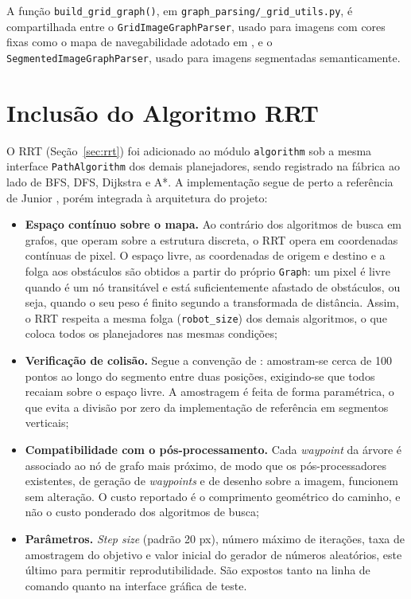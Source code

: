 \documentclass[
    12pt,
    openright,
    oneside,
    a4paper,
    english,
    brazil
]{abntex2}
\begin{document}
A função \texttt{build\_grid\_graph()}, em \texttt{graph\_parsing/\_grid\_utils.py}, é compartilhada entre o \texttt{GridImageGraphParser}, usado para imagens com cores fixas como o mapa de navegabilidade adotado em \cite{junior2025_rrt}, e o \texttt{SegmentedImageGraphParser}, usado para imagens segmentadas semanticamente.

\section{Inclusão do Algoritmo RRT}
\label{sec:impl_rrt}

O RRT (Seção~\ref{sec:rrt}) foi adicionado ao módulo \texttt{algorithm} sob a mesma interface \texttt{PathAlgorithm} dos demais planejadores, sendo registrado na fábrica ao lado de BFS, DFS, Dijkstra e A*. A implementação segue de perto a referência de Junior \cite{junior2025_rrt}, porém integrada à arquitetura do projeto:

\begin{itemize}
    \item \textbf{Espaço contínuo sobre o mapa.} Ao contrário dos algoritmos de busca em grafos, que operam sobre a estrutura discreta, o RRT opera em coordenadas contínuas de pixel. O espaço livre, as coordenadas de origem e destino e a folga aos obstáculos são obtidos a partir do próprio \texttt{Graph}: um pixel é livre quando é um nó transitável e está suficientemente afastado de obstáculos, ou seja, quando o seu peso é finito segundo a transformada de distância. Assim, o RRT respeita a mesma folga (\texttt{robot\_size}) dos demais algoritmos, o que coloca todos os planejadores nas mesmas condições;
    \item \textbf{Verificação de colisão.} Segue a convenção de \cite{junior2025_rrt}: amostram-se cerca de 100 pontos ao longo do segmento entre duas posições, exigindo-se que todos recaiam sobre o espaço livre. A amostragem é feita de forma paramétrica, o que evita a divisão por zero da implementação de referência em segmentos verticais;
    \item \textbf{Compatibilidade com o pós-processamento.} Cada \textit{waypoint} da árvore é associado ao nó de grafo mais próximo, de modo que os pós-processadores existentes, de geração de \textit{waypoints} e de desenho sobre a imagem, funcionem sem alteração. O custo reportado é o comprimento geométrico do caminho, e não o custo ponderado dos algoritmos de busca;
    \item \textbf{Parâmetros.} \textit{Step size} (padrão 20 px), número máximo de iterações, taxa de amostragem do objetivo e valor inicial do gerador de números aleatórios, este último para permitir reprodutibilidade. São expostos tanto na linha de comando quanto na interface gráfica de teste.
\end{itemize}
\end{document}
